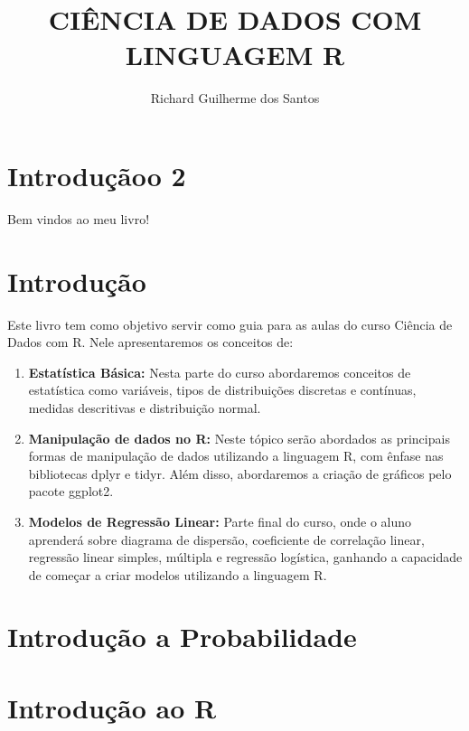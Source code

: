 \documentclass[
]{book}
\title{CIÊNCIA DE DADOS COM LINGUAGEM R}
\author{Richard Guilherme dos Santos}
\date{}
\providecommand{\tightlist}{%
  \setlength{\itemsep}{0pt}\setlength{\parskip}{0pt}}
\begin{document}
\maketitle

{
\setcounter{tocdepth}{1}
\tableofcontents
}
\hypertarget{introduuxe7uxe3oo-2}{%
\chapter{Introduçãoo 2}\label{introduuxe7uxe3oo-2}}

Bem vindos ao meu livro!

\hypertarget{introduuxe7uxe3o}{%
\chapter{Introdução}\label{introduuxe7uxe3o}}

Este livro tem como objetivo servir como guia para as aulas do curso Ciência de Dados com R. Nele apresentaremos os conceitos de:

\begin{enumerate}
\def\labelenumi{\arabic{enumi}.}
\tightlist
\item
  \textbf{Estatística Básica:} Nesta parte do curso abordaremos conceitos de estatística como variáveis, tipos de distribuições discretas e contínuas, medidas descritivas e distribuição normal.
\item
  \textbf{Manipulação de dados no R:} Neste tópico serão abordados as principais formas de manipulação de dados utilizando a linguagem R, com ênfase nas bibliotecas dplyr e tidyr. Além disso, abordaremos a criação de gráficos pelo pacote ggplot2.
\item
  \textbf{Modelos de Regressão Linear:} Parte final do curso, onde o aluno aprenderá sobre diagrama de dispersão, coeficiente de correlação linear, regressão linear simples, múltipla e regressão logística, ganhando a capacidade de começar a criar modelos utilizando a linguagem R.
\end{enumerate}

\hypertarget{introduuxe7uxe3o-a-probabilidade}{%
\chapter{Introdução a Probabilidade}\label{introduuxe7uxe3o-a-probabilidade}}

\hypertarget{introduuxe7uxe3o-ao-r}{%
\chapter{Introdução ao R}\label{introduuxe7uxe3o-ao-r}}
\end{document}
